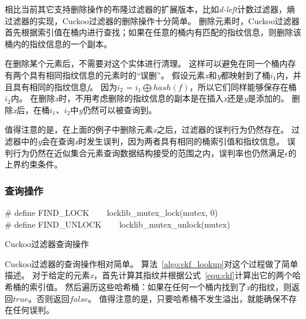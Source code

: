 相比当前其它支持删除操作的布隆过滤器的扩展版本，比如\textit{d-left}计数过滤器，熵过滤器的实现，Cuckoo过滤器的删除操作十分简单。
删除元素时，Cuckoo过滤器首先根据索引值在桶内进行查找；如果在任意的桶内有匹配的指纹信息，则删除该桶内的指纹信息的一个副本。

在删除某个元素后，不需要对这个实体进行清理。
这样可以避免在同一个桶内存有两个具有相同指纹信息的元素时的“误删”。
假设元素\textit{x}和\textit{y}都映射到了桶$i_1$内，并且具有相同的指纹信息\textit{f}。
因为$i_2$ = $i_1\bigoplus hash(f)$，所以它们同样能够保存在桶$i_2$内。
在删除\textit{x}时，不用考虑删除的指纹信息的副本是在插入\textit{x}还是\textit{y}是添加的。
删除\textit{x}后，在桶$i_1$、$i_2$中\textit{y}仍然可以被查询到。

值得注意的是，在上面的例子中删除元素\textit{x}之后，过滤器的误判行为仍然存在。
过滤器中的\textit{y}会在查询\textit{x}时发生误判，因为两者具有相同的桶索引值和指纹信息。
误判行为仍然在近似集合元素查询数据结构接受的范围之内，误判率也仍然满足$\epsilon$的上界约束条件。

\subsubsection{查询操作}

\begin{algorithm}[htbp]
\SetAlgoLined
\# define FIND\_LOCK ~~~ locklib\_mutex\_lock(mutex, 0)\\
\# define FIND\_UNLOCK ~~~ locklib\_mutex\_unlock(mutex)\\
\caption{Cuckoo过滤器查询操作}
\label{algo:ckf_lookup}
\end{algorithm}

Cuckoo过滤器的查询操作相对简单。
算法~\ref{algo:ckf_lookup}对这个过程做了简单描述。
对于给定的元素\textit{x}，首先计算其指纹并根据公式~\ref{equ:ckf}计算出它的两个哈希桶的索引值。
然后遍历这些哈希桶：如果在任何一个桶内找到了\textit{x}的指纹，则返回$true$。否则返回$false$。
值得注意的是，只要哈希桶不发生溢出，就能确保不存在任何误判。

